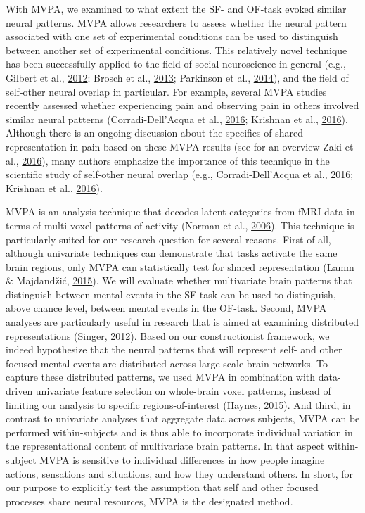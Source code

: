 \documentclass[12pt,american,a4paper,oneside,]{memoir} %
\begin{document}
With MVPA, we examined to what extent the SF- and OF-task evoked similar neural patterns. MVPA allows researchers to assess whether the neural pattern associated with one set of experimental conditions can be used to distinguish between another set of experimental conditions. This relatively novel technique has been successfully applied to the field of social neuroscience in general (e.g., Gilbert et al., \protect\hyperlink{ref-gilbert2012evaluative}{2012}; Brosch et al., \protect\hyperlink{ref-brosch2013implicit}{2013}; Parkinson et al., \protect\hyperlink{ref-parkinson2014common}{2014}), and the field of self-other neural overlap in particular. For example, several MVPA studies recently assessed whether experiencing pain and observing pain in others involved similar neural patterns (Corradi-Dell'Acqua et al., \protect\hyperlink{ref-corradi2016cross}{2016}; Krishnan et al., \protect\hyperlink{ref-krishnan2016somatic}{2016}). Although there is an ongoing discussion about the specifics of shared representation in pain based on these MVPA results (see for an overview Zaki et al., \protect\hyperlink{ref-zaki2016anatomy}{2016}), many authors emphasize the importance of this technique in the scientific study of self-other neural overlap (e.g., Corradi-Dell'Acqua et al., \protect\hyperlink{ref-corradi2016cross}{2016}; Krishnan et al., \protect\hyperlink{ref-krishnan2016somatic}{2016}).

MVPA is an analysis technique that decodes latent categories from fMRI data in terms of multi-voxel patterns of activity (Norman et al., \protect\hyperlink{ref-norman2006beyond}{2006}). This technique is particularly suited for our research question for several reasons. First of all, although univariate techniques can demonstrate that tasks activate the same brain regions, only MVPA can statistically test for shared representation (Lamm \& Majdandžić, \protect\hyperlink{ref-lamm2015role}{2015}). We will evaluate whether multivariate brain patterns that distinguish between mental events in the SF-task can be used to distinguish, above chance level, between mental events in the OF-task. Second, MVPA analyses are particularly useful in research that is aimed at examining distributed representations (Singer, \protect\hyperlink{ref-singer2012past}{2012}). Based on our constructionist framework, we indeed hypothesize that the neural patterns that will represent self- and other focused mental events are distributed across large-scale brain networks. To capture these distributed patterns, we used MVPA in combination with data-driven univariate feature selection on whole-brain voxel patterns, instead of limiting our analysis to specific regions-of-interest (Haynes, \protect\hyperlink{ref-haynes2015primer}{2015}). And third, in contrast to univariate analyses that aggregate data across subjects, MVPA can be performed within-subjects and is thus able to incorporate individual variation in the representational content of multivariate brain patterns. In that aspect within-subject MVPA is sensitive to individual differences in how people imagine actions, sensations and situations, and how they understand others. In short, for our purpose to explicitly test the assumption that self and other focused processes share neural resources, MVPA is the designated method.
\end{document}
